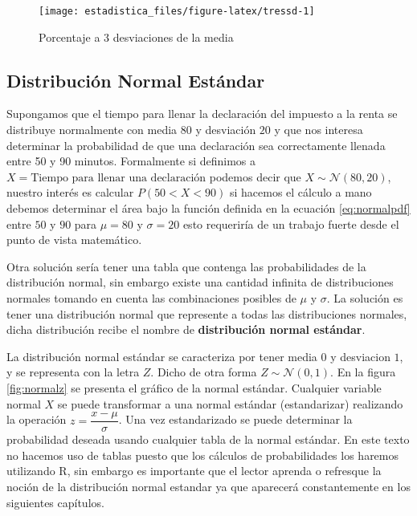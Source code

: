 \documentclass[]{book}
\begin{document}
\begin{figure}[h!]

{\centering \texttt{[image: estadistica\_files/figure-latex/tressd-1]} 

}

\caption{Porcentaje a 3 desviaciones de la media}\label{fig:tressd}
\end{figure}

\hypertarget{dne}{%
\subsection{Distribución Normal Estándar}\label{dne}}

Supongamos que el tiempo para llenar la declaración del impuesto a la renta se distribuye normalmente con media \(80\) y desviación \(20\) y que nos interesa determinar la probabilidad de que una declaración sea correctamente llenada entre 50 y 90 minutos. Formalmente si definimos a \(X=\text{Tiempo para llenar una declaración}\) podemos decir que \(X \sim \mathcal{N}\left(80,20\right)\), nuestro interés es calcular \(P\left(50< X <90\right)\) si hacemos el cálculo a mano debemos determinar el área bajo la función definida en la ecuación \eqref{eq:normalpdf} entre \(50\) y \(90\) para \(\mu=80\) y \(\sigma=20\) esto requeriría de un trabajo fuerte desde el punto de vista matemático.

Otra solución sería tener una tabla que contenga las probabilidades de la distribución normal, sin embargo existe una cantidad infinita de distribuciones normales tomando en cuenta las combinaciones posibles de \(\mu\) y \(\sigma\). La solución es tener una distribución normal que represente a todas las distribuciones normales, dicha distribución recibe el nombre de \textbf{distribución normal estándar}.

La distribución normal estándar se caracteriza por tener media \(0\) y desviacion \(1\), y se representa con la letra \(Z\). Dicho de otra forma \(Z \sim \mathcal{N}\left(0,1\right)\). En la figura \ref{fig:normalz} se presenta el gráfico de la normal estándar. Cualquier variable normal \(X\) se puede transformar a una normal estándar (estandarizar) realizando la operación \(z=\dfrac{x-\mu}{\sigma}\). Una vez estandarizado se puede determinar la probabilidad deseada usando cualquier tabla de la normal estándar. En este texto no hacemos uso de tablas puesto que los cálculos de probabilidades los haremos utilizando R, sin embargo es importante que el lector aprenda o refresque la noción de la distribución normal estandar ya que aparecerá constantemente en los siguientes capítulos.
\end{document}
